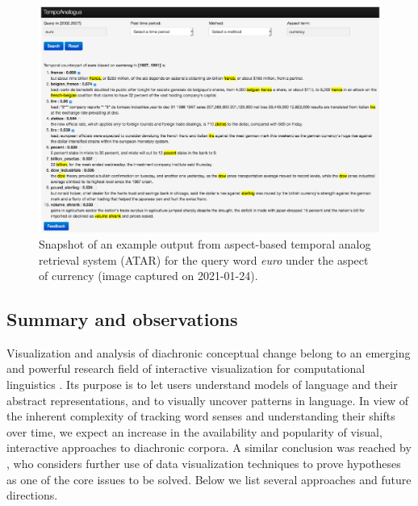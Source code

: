 \documentclass[output=paper]{langsci/langscibook}
\begin{document}
\begin{figure}
	\includegraphics[width=\textwidth]{figures/JATOWT_WSDM.png}
    \caption{Snapshot of an example output from aspect-based temporal analog retrieval system (ATAR) for the query word \emph{euro} under the aspect of currency (image captured on 2021-01-24).\label{fig:wsdm}}
\end{figure}


\subsection{Summary and observations}
Visualization and analysis of diachronic conceptual change belong to an emerging and powerful research field of interactive visualization for computational linguistics \citep{collins2008interactive}. Its purpose is to let users understand models of language and their abstract representations, and to visually uncover patterns in language. In view of the inherent complexity of tracking word senses and understanding their shifts over time, we expect an increase in the availability and popularity of visual, interactive approaches to diachronic corpora. 
A similar conclusion was reached by \citet{tang-2018}, who considers further use of data visualization techniques to prove hypotheses  as one of the core issues to be solved. Below we list several approaches and future directions.
\end{document}
